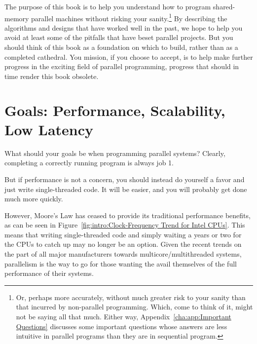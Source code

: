 The purpose of this book is to help you understand how to program
shared-memory parallel machines without risking your sanity.\footnote{
	Or, perhaps more accurately, without much greater risk to your
	sanity than that incurred by non-parallel programming.
	Which, come to think of it, might not be saying all that much.
	Either way, Appendix~\ref{cha:app:Important Questions} discusses
	some important questions whose answers are less intuitive in
	parallel programs than they are in sequential program.}
By describing the algorithms and designs that have worked well in
the past, we hope to help you avoid at least some of the pitfalls
that have beset parallel projects.
But you should think of this book as a foundation on which to build,
rather than as a completed cathedral.
You mission, if you choose to accept, is to help make further progress
in the exciting field of parallel programming, progress that should
in time render this book obsolete.

\section{Goals: Performance, Scalability, Low Latency}
\label{sec:intro:Goals: Performance, Scalability, Low Latency}

What should your goals be when programming parallel systems?
Clearly, completing a correctly running program is always job 1.

But if performance is not a concern, you should instead do yourself
a favor and just write single-threaded code.
It will be easier, and you will probably get done much more quickly.

However, Moore's Law has ceased to provide its traditional performance
benefits, as can be seen in
Figure~\ref{fig:intro:Clock-Frequency Trend for Intel CPUs}.
This means that writing single-threaded code and simply waiting
a years or two for the CPUs to catch up may no longer be an option.
Given the recent trends on the part of all major manufacturers towards
multicore/multithreaded systems, parallelism is the way to go for
those wanting the avail themselves of the full performance of their
systems.


